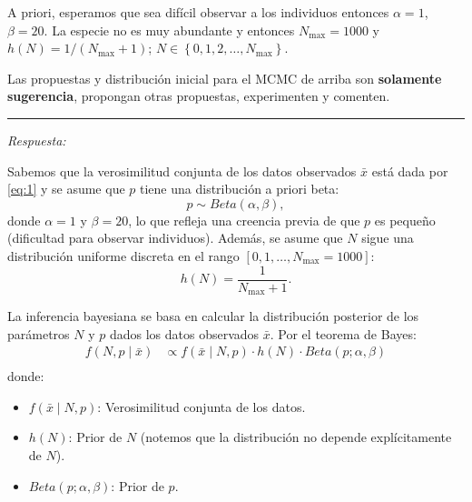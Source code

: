 	A priori, esperamos que sea difícil observar a los individuos entonces $\alpha=1$, $\beta=20$. La especie no es muy abundante y entonces $N_{\max }= 1000$ y $h(N)=1 /\left(N_{\max }+1\right)$; $N \in\left\{0,1,2, \ldots, N_{\max }\right\}$.
	
	Las propuestas y distribución inicial para el MCMC de arriba son \textbf{solamente sugerencia}, propongan otras propuestas, experimenten y comenten.

\vspace{5mm}
{\color{gray} \hrule}
\vspace{5mm}
\textcolor{BrickRed}{\it Respuesta:}

Sabemos que la verosimilitud conjunta de los datos observados $\bar{x}$ está dada por \eqref{eq:1} y se asume que $p$ tiene una distribución a priori beta:
\begin{equation} \label{eq:4}
	p \sim Beta (\alpha, \beta),
\end{equation}
donde $\alpha = 1$  y  $\beta = 20$, lo que refleja una creencia previa de que $p$ es pequeño (dificultad para observar individuos). Además, se asume que $N$ sigue una distribución uniforme discreta en el rango $[0, 1, \dots, N_{\max} = 1000]$:
\begin{equation} \label{eq:5}
	h(N) = \frac{1}{N_{\max} + 1}.
\end{equation}

La inferencia bayesiana se basa en calcular la distribución posterior de los parámetros $N$ y $p$ dados los datos observados $\bar{x}$. Por el teorema de Bayes:
\begin{equation} \label{eq:6}
	\begin{aligned}
		f(N, p \mid \bar{x}) 
		&\propto f(\bar{x} \mid N, p) \cdot h(N) \cdot Beta (p; \alpha, \beta)\\
	\end{aligned}
\end{equation}
donde:
\begin{itemize}
	\item $f(\bar{x} \mid N, p)$: Verosimilitud conjunta de los datos.
	\item $h(N)$: Prior de $N$ (notemos que la distribución no depende explícitamente de $N$).
	\item $Beta (p; \alpha, \beta)$: Prior de $p$.
\end{itemize}

